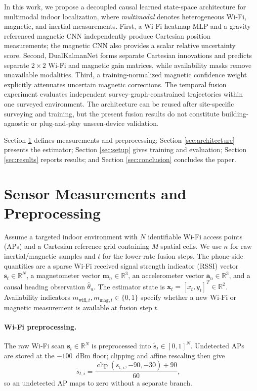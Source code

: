 \documentclass[conference]{IEEEtran}
\begin{document}
In this work, we propose a decoupled causal learned state-space architecture for multimodal indoor localization, where \emph{multimodal} denotes heterogeneous Wi-Fi, magnetic, and inertial measurements. First, a Wi-Fi heatmap MLP and a gravity-referenced magnetic CNN independently produce Cartesian position measurements; the magnetic CNN also provides a scalar relative uncertainty score. Second, DualKalmanNet forms separate Cartesian innovations and predicts separate $2\times2$ Wi-Fi and magnetic gain matrices, while availability masks remove unavailable modalities. Third, a training-normalized magnetic confidence weight explicitly attenuates uncertain magnetic corrections. The temporal fusion experiment evaluates independent survey-graph-constrained trajectories within one surveyed environment. The architecture can be reused after site-specific surveying and training, but the present fusion results do not constitute building-agnostic or plug-and-play unseen-device validation.

Section \ref{sec:measurements} defines measurements and preprocessing; Section \ref{sec:architecture} presents the estimator; Section \ref{sec:setup} gives training and evaluation; Section \ref{sec:results} reports results; and Section \ref{sec:conclusion} concludes the paper.

\section{Sensor Measurements and Preprocessing}\label{sec:measurements}

Assume a targeted indoor environment with $N$ identifiable Wi-Fi access points (APs) and a Cartesian reference grid containing $M$ spatial cells. We use $n$ for raw inertial/magnetic samples and $t$ for the lower-rate fusion steps. The phone-side quantities are a sparse Wi-Fi received signal strength indicator (RSSI) vector $\mathbf{s}_t\in\mathbb{R}^N$, a magnetometer vector $\mathbf{m}_n\in\mathbb{R}^3$, an accelerometer vector $\mathbf{a}_n\in\mathbb{R}^3$, and a causal heading observation $\hat{\theta}_n$. The estimator state is $\mathbf{x}_t=[x_t,y_t]^T\in\mathbb{R}^2$. Availability indicators $m_{\mathrm{wifi},t},m_{\mathrm{mag},t}\in\{0,1\}$ specify whether a new Wi-Fi or magnetic measurement is available at fusion step $t$.

\paragraph{Wi-Fi preprocessing.}
The raw Wi-Fi scan $\mathbf{s}_t \in \mathbb{R}^N$ is preprocessed into $\tilde{\mathbf{s}}_t \in [0,1]^N$. Undetected APs are stored at the $-100$~dBm floor; clipping and affine rescaling then give
\begin{equation}
\tilde{s}_{t,i}=\frac{\operatorname{clip}(s_{t,i},-90,-30)+90}{60},
\label{eq:wifi_norm}
\end{equation}
so an undetected AP maps to zero without a separate branch.
\end{document}

